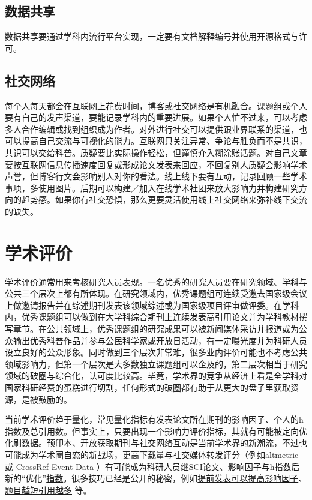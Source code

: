 \documentclass[]{tufte-book}
\begin{document}
\hypertarget{ux6570ux636eux5171ux4eab}{%
\subsection{数据共享}\label{ux6570ux636eux5171ux4eab}}

数据共享要通过学科内流行平台实现，一定要有文档解释编号并使用开源格式与许可。

\hypertarget{ux793eux4ea4ux7f51ux7edc}{%
\subsection{社交网络}\label{ux793eux4ea4ux7f51ux7edc}}

每个人每天都会在互联网上花费时间，博客或社交网络是有机融合。课题组或个人要有自己的发声渠道，要能记录学科内的重要进展。如果个人忙不过来，可以考虑多人合作编辑或找到组织成为作者。对外进行社交可以提供跟业界联系的渠道，也可以提高自己交流与可视化的能力。互联网只关注异常、争论与胜负而不是共识，共识可以交给科普。质疑要比实际操作轻松，但谨慎介入糊涂账话题。对自己文章要按互联网信息传播速度回复或形成论文发表来回应，不回复别人质疑会影响学术声誉，但博客行文会影响别人对你的看法。线上线下要有互动，记录回顾一些学术事项，多使用图片。后期可以构建／加入在线学术社团来放大影响力并构建研究方向的趋势感。如果你有社交恐惧，那么更要灵活使用线上社交网络来弥补线下交流的缺失。

\hypertarget{ux5b66ux672fux8bc4ux4ef7}{%
\section{学术评价}\label{ux5b66ux672fux8bc4ux4ef7}}

学术评价通常用来考核研究人员表现。一名优秀的研究人员要在研究领域、学科与公共三个层次上都有所体现。在研究领域内，优秀课题组可连续受邀去国家级会议上做邀请报告并在综述期刊发表该领域综述或为国家级项目评审做评委。在学科内，优秀课题组可以做到在大学科综合期刊上连续发表高引用论文并为学科教材撰写章节。在公共领域上，优秀课题组的研究成果可以被新闻媒体采访并报道或为公众输出优秀科普作品并参与公民科学家或开放日活动，有一定曝光度并为科研人员设立良好的公众形象。同时做到三个层次非常难，很多业内评价可能也不考虑公共领域影响力，但第一个层次是大多数独立课题组可以企及的，第二层次相当于研究领域的破圈与综合化，认可度比较高。毕竟，学术界的竞争从经济上看是全学科对国家科研经费的蛋糕进行切割，任何形式的破圈都有助于从更大的盘子里获取资源，是被鼓励的。

当前学术评价趋于量化，常见量化指标有发表论文所在期刊的影响因子、个人的h指数及总引用数。但事实上，只要出现一个影响力评价指标，其就有可能被定向优化刷数据。预印本、开放获取期刊与社交网络互动是当前学术界的新潮流，不过也可能成为学术圈自恋的新战场，更高下载量与社交媒体转发评分（例如\href{https://www.altmetric.com/}{altmetric} 或 \href{https://www.crossref.org/education/event-data/}{CrossRef Event Data} ）有可能成为科研人员继SCI论文、\href{https://onlinelibrary.wiley.com/doi/full/10.1111/eci.13151}{影响因子}与h指数后新的``优化''\href{https://liorpachter.wordpress.com/2019/01/29/technologies-of-narcissism/}{指数}。很多技巧已经是公开的秘密，例如\href{http://journals.plos.org/plosone/article?id=10.1371/journal.pone.0053374}{提前发表可以提高影响因子}、\href{http://rsos.royalsocietypublishing.org/content/2/8/150266}{题目越短引用越多} 等。
\end{document}

